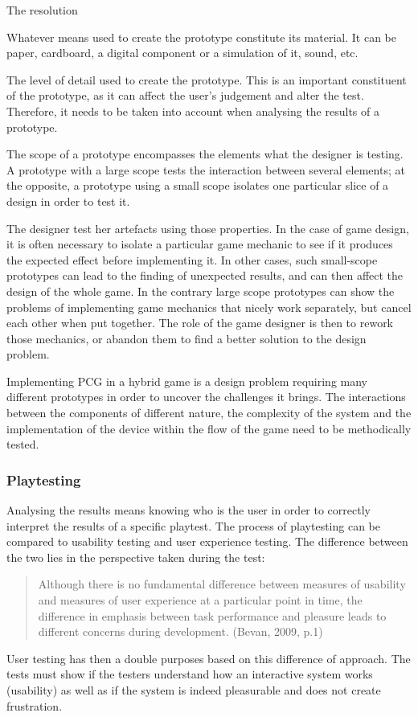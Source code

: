\begin{labeling}{The resolution}
\item [\textbf{The material}] Whatever means used to create the prototype constitute its material. It can be paper, cardboard, a digital component or a simulation of it, sound, etc.
\item [\textbf{The resolution}] The level of detail used to create the prototype. This is an important constituent of the prototype, as it can affect the user's judgement and alter the test. Therefore, it needs to be taken into account when analysing the results of a prototype.
\item [\textbf{The scope}] The scope of a prototype encompasses the elements what the designer is testing. A prototype with a large scope tests the interaction between several elements; at the opposite, a prototype using a small scope isolates one particular slice of a design in order to test it.
\end{labeling}

The designer test her artefacts using those properties. In the case of game design, it is often necessary to isolate a particular game mechanic to see if it produces the expected effect before implementing it. In other cases, such small-scope prototypes can lead to the finding of unexpected results, and can then affect the design of the whole game. In the contrary large scope prototypes can show the problems of implementing game mechanics that nicely work separately, but cancel each other when put together. The role of the game designer is then to rework those mechanics, or abandon them to find a better solution to the design problem. 

Implementing PCG in a hybrid game is a design problem requiring many different prototypes in order to uncover the challenges it brings. The interactions between the components of different nature, the complexity of the system and the implementation of the device within the flow of the game need to be methodically tested.
\subsubsection{Playtesting}
Analysing the results means knowing who is the user in order to correctly interpret the results of a specific playtest. The process of playtesting can be compared to usability testing and user experience testing. The difference between the two lies in the perspective taken during the test:
\begin{quotation}
Although there is no fundamental difference between measures of usability and measures of user experience at a particular point in time, the difference in emphasis between task performance and pleasure leads to different concerns during development. (Bevan, 2009, p.1) \cite{pdf:use}
\end{quotation}
User testing has then a double purposes based on this difference of approach. The tests must show if the testers understand how an interactive system works (usability) as well as if the system is indeed pleasurable and does not create frustration.

